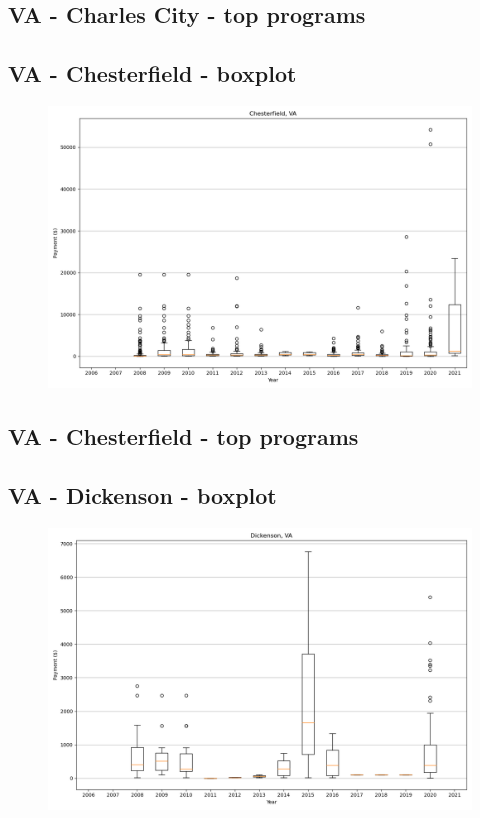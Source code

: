 \subsection*{VA - Charles City - top programs}

\newpage
\subsection*{VA - Chesterfield - boxplot}
\begin{figure}[h]
\centering
\includegraphics[width=7in]{../output/boxplots/counties/Chesterfield-VA_boxplot.png}
\end{figure}


\subsection*{VA - Chesterfield - top programs}

\newpage
\subsection*{VA - Dickenson - boxplot}
\begin{figure}[h]
\centering
\includegraphics[width=7in]{../output/boxplots/counties/Dickenson-VA_boxplot.png}
\end{figure}


